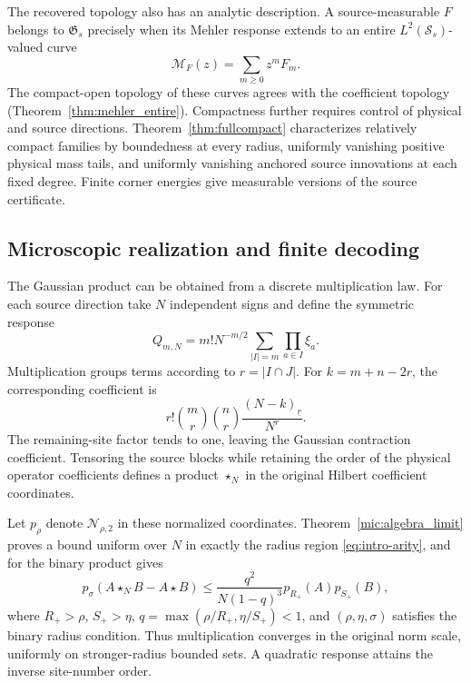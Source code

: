\documentclass[11pt,a4paper]{amsart}
\numberwithin{equation}{section}
\theoremstyle{definition}
\theoremstyle{remark}
\newcommand{\Sch}{\mathcal S}
\newcommand{\Gaus}{\mathfrak G}
\begin{document}
The recovered topology also has an analytic description. A source-measurable $F$ belongs to $\Gaus_s$ precisely when its Mehler response extends to an entire $L^2(\Sch_s)$-valued curve
\[
 \mathscr M_F(z)=\sum_{m\ge0}z^mF_m.
\]
The compact-open topology of these curves agrees with the coefficient topology (Theorem~\ref{thm:mehler_entire}). Compactness further requires control of physical and source directions. Theorem~\ref{thm:fullcompact} characterizes relatively compact families by boundedness at every radius, uniformly vanishing positive physical mass tails, and uniformly vanishing anchored source innovations at each fixed degree. Finite corner energies give measurable versions of the source certificate.

\subsection{Microscopic realization and finite decoding}
The Gaussian product can be obtained from a discrete multiplication law. For each source direction take $N$ independent signs and define the symmetric response
\[
 Q_{m,N}=m!N^{-m/2}\sum_{|I|=m}\prod_{a\in I}\xi_a.
\]
Multiplication groups terms according to $r=|I\cap J|$. For $k=m+n-2r$, the corresponding coefficient is
\[
 r!\binom mr\binom nr\frac{(N-k)_{\underline r}}{N^r}.
\]
The remaining-site factor tends to one, leaving the Gaussian contraction coefficient. Tensoring the source blocks while retaining the order of the physical operator coefficients defines a product $\star_N$ in the original Hilbert coefficient coordinates.

Let $p_\rho$ denote $\mathcal N_{\rho,2}$ in these normalized coordinates. Theorem~\ref{mic:algebra_limit} proves a bound uniform over $N$ in exactly the radius region \eqref{eq:intro-arity}, and for the binary product gives
\begin{equation}\label{eq:intro_micro_rate}
 p_\sigma(A\star_NB-A\star B)
 \le\frac{q^2}{N(1-q)^3}p_{R_+}(A)p_{S_+}(B),
\end{equation}
where $R_+>\rho$, $S_+>\eta$, $q=\max(\rho/R_+,\eta/S_+)<1$, and $(\rho,\eta,\sigma)$ satisfies the binary radius condition. Thus multiplication converges in the original norm scale, uniformly on stronger-radius bounded sets. A quadratic response attains the inverse site-number order.
\end{document}
